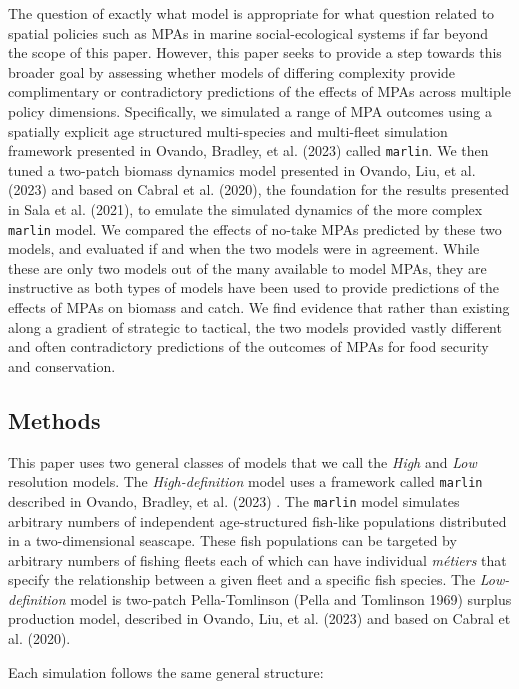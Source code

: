\documentclass[
  default,
  lineno,
  referee]{sn-jnl}
\begin{document}
The question of exactly what model is appropriate for what question
related to spatial policies such as MPAs in marine social-ecological
systems if far beyond the scope of this paper. However, this paper seeks
to provide a step towards this broader goal by assessing whether models
of differing complexity provide complimentary or contradictory
predictions of the effects of MPAs across multiple policy dimensions.
Specifically, we simulated a range of MPA outcomes using a spatially
explicit age structured multi-species and multi-fleet simulation
framework presented in Ovando, Bradley, et al. (2023) called
\texttt{marlin}. We then tuned a two-patch biomass dynamics model
presented in Ovando, Liu, et al. (2023) and based on Cabral et al.
(2020), the foundation for the results presented in Sala et al. (2021),
to emulate the simulated dynamics of the more complex \texttt{marlin}
model. We compared the effects of no-take MPAs predicted by these two
models, and evaluated if and when the two models were in agreement.
While these are only two models out of the many available to model MPAs,
they are instructive as both types of models have been used to provide
predictions of the effects of MPAs on biomass and catch. We find
evidence that rather than existing along a gradient of strategic to
tactical, the two models provided vastly different and often
contradictory predictions of the outcomes of MPAs for food security and
conservation.

\subsection{Methods}\label{methods}

This paper uses two general classes of models that we call the
\emph{High} and \emph{Low} resolution models. The \emph{High-definition}
model uses a framework called \texttt{marlin} described in Ovando,
Bradley, et al. (2023) . The \texttt{marlin} model simulates arbitrary
numbers of independent age-structured fish-like populations distributed
in a two-dimensional seascape. These fish populations can be targeted by
arbitrary numbers of fishing fleets each of which can have individual
\emph{métiers} that specify the relationship between a given fleet and a
specific fish species. The \emph{Low-definition} model is two-patch
Pella-Tomlinson (Pella and Tomlinson 1969) surplus production model,
described in Ovando, Liu, et al. (2023) and based on Cabral et al.
(2020).

Each simulation follows the same general structure:
\end{document}
